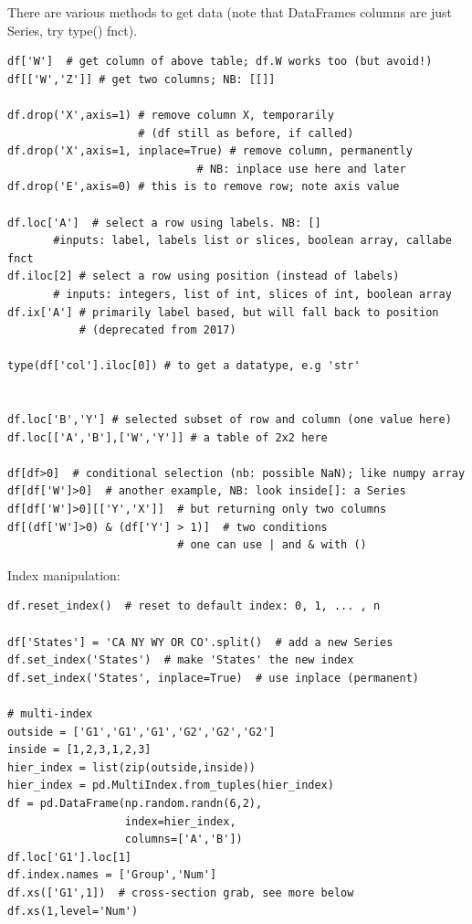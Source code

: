 \documentclass[11pt]{article}
\begin{document}
There are various methods to get data (note that DataFrames columns are just Series, try type() fnct).
\begin{lstlisting}
df['W']  # get column of above table; df.W works too (but avoid!)
df[['W','Z']] # get two columns; NB: [[]]

df.drop('X',axis=1) # remove column X, temporarily 
                    # (df still as before, if called)
df.drop('X',axis=1, inplace=True) # remove column, permanently
                             # NB: inplace use here and later
df.drop('E',axis=0) # this is to remove row; note axis value

df.loc['A']  # select a row using labels. NB: []
	   #inputs: label, labels list or slices, boolean array, callabe fnct
df.iloc[2] # select a row using position (instead of labels)
	   # inputs: integers, list of int, slices of int, boolean array
df.ix['A'] # primarily label based, but will fall back to position
           # (deprecated from 2017)

type(df['col'].iloc[0]) # to get a datatype, e.g 'str'


df.loc['B','Y'] # selected subset of row and column (one value here)
df.loc[['A','B'],['W','Y']] # a table of 2x2 here

df[df>0]  # conditional selection (nb: possible NaN); like numpy array
df[df['W']>0]  # another example, NB: look inside[]: a Series
df[df['W']>0][['Y','X']]  # but returning only two columns
df[(df['W']>0) & (df['Y'] > 1)]  # two conditions 
                          # one can use | and & with ()
\end{lstlisting}

Index manipulation:
\begin{lstlisting}
df.reset_index()  # reset to default index: 0, 1, ... , n

df['States'] = 'CA NY WY OR CO'.split()  # add a new Series
df.set_index('States')  # make 'States' the new index
df.set_index('States', inplace=True)  # use inplace (permanent)

# multi-index
outside = ['G1','G1','G1','G2','G2','G2']
inside = [1,2,3,1,2,3]
hier_index = list(zip(outside,inside))
hier_index = pd.MultiIndex.from_tuples(hier_index)
df = pd.DataFrame(np.random.randn(6,2),
                  index=hier_index,
                  columns=['A','B'])
df.loc['G1'].loc[1]
df.index.names = ['Group','Num']
df.xs(['G1',1])  # cross-section grab, see more below
df.xs(1,level='Num')
\end{lstlisting}
\end{document}
